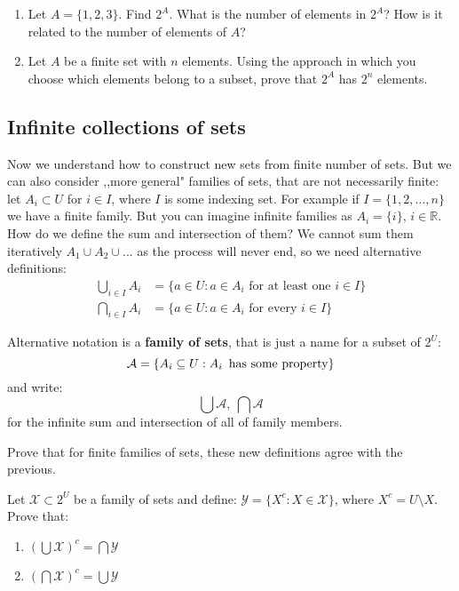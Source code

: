 \begin{prob}
    \begin{enumerate}
	\item Let $A=\{1,2,3\}$. Find $2^A$. What is the number of elements in $2^A$? How is it related to the
	number of elements of $A$?
	\item Let $A$ be a finite set with $n$ elements. Using the approach in which you choose which elements belong
		to a subset, prove that $2^A$ has $2^n$ elements.
    \end{enumerate}
\end{prob}

\subsection{Infinite collections of sets}
Now we understand how to construct new sets from finite number of sets. But we can also consider ,,more general" families
of sets, that are not necessarily finite:
let $A_i\subset U$ for $i\in I$, where $I$ is some indexing set. For example if $I=\{1,2,\dots,n\}$ we have a finite family. But you can imagine infinite families as $A_i = \{i\},\,i \in \mathbb{R}$. How do we define
the sum and intersection of them? We cannot sum them iteratively $A_1\cup A_2\cup ...$ as the process will never
end, so we need alternative definitions:
\begin{align*}
	\bigcup_{i\in I}A_i &= \{a\in U : a\in A_i \text{ for at least one }i\in I\}\\
	\bigcap_{i\in I}A_i &= \{a\in U : a\in A_i \text{ for every }i\in I\}
\end{align*}

\noindent Alternative notation is a \textbf{family of sets}, that is
just a name for a subset of $2^U$:
$$\mathcal A = \{A_i\subseteq U : A_i\text{\, has some property}\}$$
and write:
$$\bigcup \mathcal A,~\bigcap \mathcal A$$
for the infinite sum and intersection of all of family members.

\begin{prob}
	Prove that for finite families of sets, these new definitions agree
  with the previous.
\end{prob}

\begin{prob}
	Let $\mathcal X \subset 2^U$ be a family of sets and define:
  $\mathcal Y=\{X^c : X\in \mathcal X\}$, where $X^c=U\setminus X$.
  Prove that:
  \begin{enumerate}
    \item $(\bigcup \mathcal X)^c = \bigcap \mathcal Y$
    \item $(\bigcap \mathcal X)^c = \bigcup \mathcal Y$
  \end{enumerate}
\end{prob}

